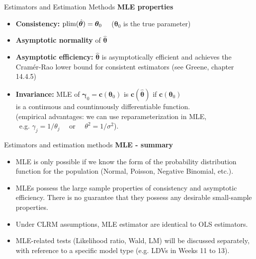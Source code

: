 \documentclass{beamer}
\begin{document}
\begin{frame}{Estimators and Estimation Methods}
\textbf{MLE properties}\\
\begin{itemize}
    \item \textbf{Consistency:} $\textnormal{plim}(\hat{\bm{\theta}}) = \bm{\theta}_0$ ~~($\bm{\theta}_0$ is the true parameter)
    \medskip
    \item \textbf{Asymptotic normality} of $\bm{\hat{\theta}}$
    \medskip
    \item \textbf{Asymptotic efficiency:}  $\bm{\hat{\theta}}$ is asymptotically efficient and achieves the Cramér-Rao lower bound for consistent estimators (see Greene, chapter 14.4.5)
    \medskip
    \item \textbf{Invariance:} MLE of $\bm{\gamma}_0=\bm{c}(\bm{\theta}_0)$ is $\bm{c}(\bm{\hat{\theta}})$ if $\bm{c}(\bm{\theta}_0)$ \\is a continuous and countinuously differentiable function.\\ \smallskip \footnotesize{ 
    (empirical advantages: we can use reparameterization in MLE, \\~e.g. $\gamma_j = 1/\theta_j$ ~~or~~ $\theta^2 = 1/\sigma^2$).}
\end{itemize}
\end{frame}
\begin{frame}{Estimators and estimation methods}
\textbf{MLE - summary}\\
\begin{itemize}
\item MLE is only possible if we know the form of the probability distribution function for the population (Normal, Poisson, Negative Binomial, etc.).
\medskip
\item MLEs possess the large sample properties of consistency and asymptotic efficiency. There is no guarantee that they possess any desirable small-sample properties. 
\medskip
\item Under CLRM assumptions, MLE estimator are identical to OLS estimators.
\medskip
\item MLE-related tests (Likelihood ratio, Wald, LM) will be discussed separately, with reference to a specific model type (e.g. LDVs in Weeks 11 to 13).
\end{itemize}
\end{frame}
\end{document}
